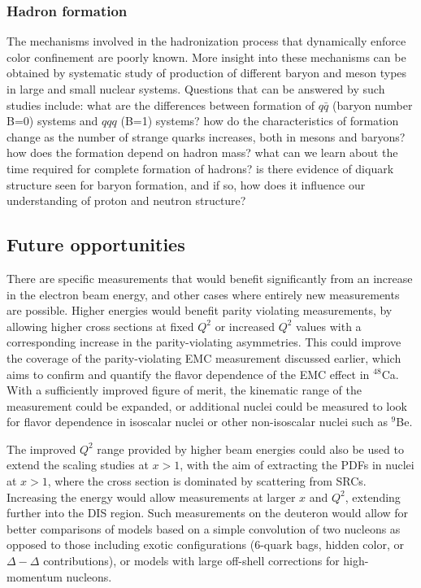 \subsubsection{Hadron formation}
The mechanisms involved in the hadronization process that dynamically enforce color confinement are poorly known. More insight into these mechanisms can be obtained by systematic study of production of different baryon and meson types in large and small nuclear systems. Questions that can be answered by such studies include: what are the differences between formation of $q\bar{q}$ (baryon number B=0) systems and $qqq$ (B=1) systems? how do the characteristics of formation change as the number of strange quarks increases, both in mesons and baryons? how does the formation depend on hadron mass? what can we learn about the time required for complete formation of hadrons? is there evidence of diquark structure seen for baryon formation, and if so, how does it influence our understanding of proton and neutron structure?

\subsection{Future opportunities} 

There are specific measurements that would benefit significantly from an increase in the electron beam energy, and other cases where entirely new measurements are possible. Higher energies would benefit parity violating measurements, by allowing higher cross sections at fixed $Q^2$ or increased $Q^2$ values with a corresponding increase in the parity-violating asymmetries. This could improve the coverage of the parity-violating EMC measurement discussed earlier, which aims to confirm and quantify the flavor dependence of the EMC effect in $^{48}$Ca. With a sufficiently improved figure of merit, the kinematic range of the measurement could be expanded, or additional nuclei could be measured to look for flavor dependence  in isoscalar nuclei or other non-isoscalar nuclei such as $^9$Be. 

The improved $Q^2$ range provided by higher beam energies could also be used to extend the scaling studies at $x>1$, with the aim of extracting the PDFs in nuclei at $x>1$, where the cross section is dominated by scattering from SRCs. Increasing the energy would allow measurements at larger $x$ and $Q^2$, extending further into the DIS region. Such measurements on the deuteron would allow for better comparisons of models based on a simple convolution of two nucleons as opposed to those including exotic configurations (6-quark bags, hidden color, or $\Delta-\Delta$ contributions), or models with large off-shell corrections for high-momentum nucleons.

